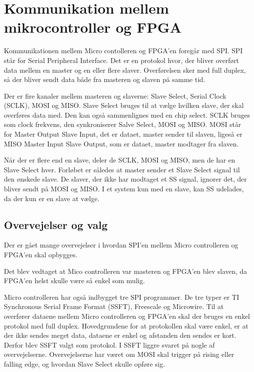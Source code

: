 \section{Kommunikation mellem mikrocontroller og FPGA}

Kommunikationen mellem Micro contolleren og FPGA’en foregår med SPI. SPI står for Serial Peripheral Interface. Det er en protokol hvor, der bliver overført data mellem en master og en eller flere slaver. Overførelsen sker med full duplex, så der bliver sendt data både fra masteren og slaven på samme tid.

Der er fire kanaler mellem masteren og slaverne: Slave Select, Serial Clock (SCLK), MOSI og MISO. Slave Select bruges til at vælge hvilken slave, der skal overføres data med. Den kan også sammenlignes med en chip select. SCLK bruges som clock frekvens, den synkroniserer Salve Select, MOSI og MISO. MOSI står for Master Output Slave Input, det er dataet, master sender til slaven, ligeså er MISO Master Input Slave Output, som er dataet, master modtager fra slaven.

Når der er flere end en slave, deler de SCLK, MOSI og MISO, men de har en Slave Select hver. Forløbet er således at master sender et Slave Select signal til den ønskede slave. De slaver, der ikke har modtaget et SS signal, ignorer det, der bliver sendt på MOSI og MISO. I et system kun med en slave, kan SS udelades, da der kun er en slave at vælge. 
 

\subsection{Overvejelser og valg}
Der er gået mange overvejelser i hvordan SPI'en mellem Micro controlleren og FPGA'en skal  opbygges.

Det blev vedtaget at Mico controlleren var masteren og FPGA'en blev slaven, da FPGA'en helst skulle være så enkel som mulig.

Micro controlleren har også indbygget tre SPI programmer. De tre typer er TI Synchronous Serial Frame Format (SSFT), Freescale og Microwire. Til at overfører dataene mellem Micro controlleren og FPGA’en skal der bruges en enkel protokol med full duplex. Hovedgrundene for at protokollen skal være enkel, er at der ikke sendes meget data, dataene er enkel og afstanden den sendes er kort. Derfor blev SSFT valgt som protokol. I SSFT liggre svaret på nogle af overvejelserne. Overvejelserne har været om MOSI skal trigger på rising eller falling edge, og hvordan Slave Select skulle opføre sig.

